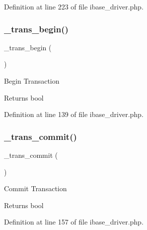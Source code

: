 Definition at line 223 of file ibase\+\_\+driver.\+php.

\mbox{\label{class_c_i___d_b__ibase__driver_ac81ac882c1d54347d810199a15856aac}} 
\subsubsection{\texorpdfstring{\_trans\_begin()}{\_trans\_begin()}}
{\footnotesize\ttfamily \+\_\+trans\+\_\+begin (\begin{DoxyParamCaption}{ }\end{DoxyParamCaption})\hspace{0.3cm}{\ttfamily [protected]}}

Begin Transaction

\begin{DoxyReturn}{Returns}
bool 
\end{DoxyReturn}


Definition at line 139 of file ibase\+\_\+driver.\+php.

\mbox{\label{class_c_i___d_b__ibase__driver_a6fe7f373e0b11cfae23a5f41c0b35dda}} 
\subsubsection{\texorpdfstring{\_trans\_commit()}{\_trans\_commit()}}
{\footnotesize\ttfamily \+\_\+trans\+\_\+commit (\begin{DoxyParamCaption}{ }\end{DoxyParamCaption})\hspace{0.3cm}{\ttfamily [protected]}}

Commit Transaction

\begin{DoxyReturn}{Returns}
bool 
\end{DoxyReturn}


Definition at line 157 of file ibase\+\_\+driver.\+php.

\mbox{\label{class_c_i___d_b__ibase__driver_ad49a116b0776c26b53114c9093fd102a}} 
